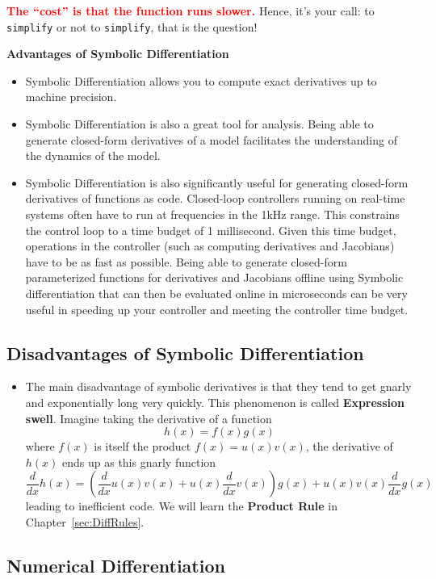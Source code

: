 \textcolor{red}{\bf The ``cost'' is that the function runs slower.} Hence, it's your call: to \texttt{simplify} or not to \texttt{simplify}, that is the question!

\textbf{Advantages of Symbolic Differentiation}
\begin{itemize}
    \item Symbolic Differentiation allows you to compute exact derivatives up to machine precision.
    \item Symbolic Differentiation is also a great tool for analysis. Being able to generate closed-form derivatives of a model facilitates the understanding of the dynamics of the model.
    \item Symbolic Differentiation is also significantly useful for generating closed-form derivatives of functions as code. Closed-loop controllers running on real-time systems often have to run at frequencies in the 1kHz range. This constrains the control loop to a time budget of 1 millisecond. Given this time budget, operations in the controller (such as computing derivatives and Jacobians) have to be as fast as possible. Being able to generate closed-form parameterized functions for derivatives and Jacobians offline using Symbolic differentiation that can then be evaluated online in microseconds can be very useful in speeding up your controller and meeting the controller time budget.
\end{itemize}


\subsection*{Disadvantages of Symbolic Differentiation}
\begin{itemize}
    \item The main disadvantage of symbolic derivatives is that they tend to get gnarly and exponentially long very quickly. This phenomenon is called \textbf{Expression swell}. Imagine taking the derivative of a function 
    $$
    h(x) = f(x)g(x)
    $$ 
    where $f(x)$ is itself the product $f(x) = u(x)v(x)$, the derivative of $h(x)$ ends up as this gnarly function 
    $$
    \frac{d}{dx}h(x) = \left(\frac{d}{dx}u(x)v(x) + u(x)\frac{d}{dx}v(x)\right)g(x) + u(x)v(x)\frac{d}{dx}g(x)
    $$
    leading to inefficient code. We will learn the \textbf{Product Rule} in Chapter~\ref{sec:DiffRules}. 
\end{itemize}

\subsection{Numerical Differentiation}

